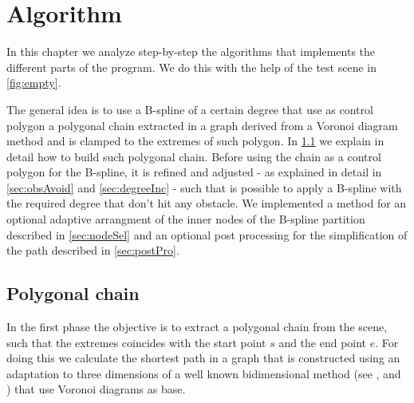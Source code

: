 \documentclass[dissertation.tex]{subfiles}
\begin{document}
\chapter{Algorithm}
In this chapter we analyze step-by-step the algorithms that implements
the different parts of the program. We do this with the help of the
test scene in \cref{fig:empty}.

The general idea is to use a B-spline of a certain degree that use as
control polygon a polygonal chain extracted in a graph
derived from a Voronoi diagram method and is clamped to the extremes
of such polygon. In \cref{sec:polChain} we explain in detail how to
build such polygonal chain. Before using the chain as a control
polygon for the B-spline, it is refined and adjusted - as explained in
detail in \cref{sec:obsAvoid} and \cref{sec:degreeInc} - such that is
possible to apply a B-spline with the required degree that don't hit
any obstacle. We implemented a method for an optional adaptive
arrangment of the inner nodes of the B-spline partition described in
\cref{sec:nodeSel} and an optional post processing for the
simplification of the path described in \cref{sec:postPro}.
\section{Polygonal chain}\label{sec:polChain}
In the first phase the objective is to extract a polygonal chain from
the scene, such that the extremes coincides with the start point $s$
and the end point $e$. For doing this we calculate the shortest path
in a graph that is constructed using an adaptation to three
dimensions of a well known bidimensional method (see
\cite{bhattacharya}, \cite{ho-liu} and \cite{seda-pich}) that use
Voronoi diagrams as base.
\end{document}
